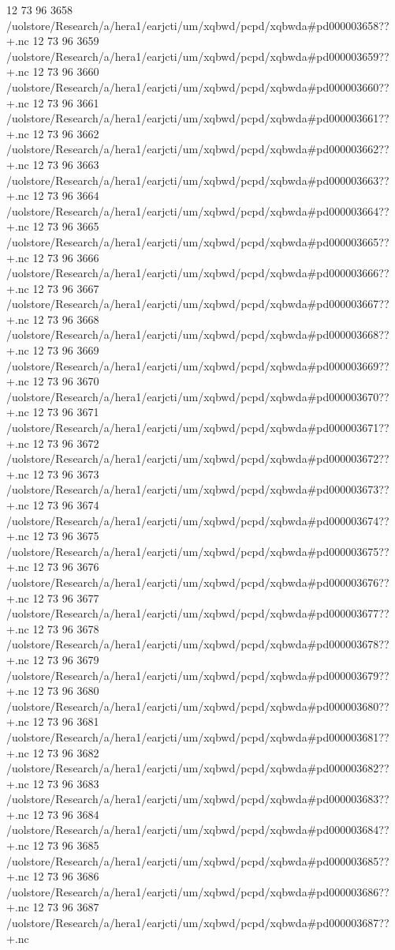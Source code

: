 12 73 96
3658
/uolstore/Research/a/hera1/earjcti/um/xqbwd/pcpd/xqbwda#pd000003658??+.nc
12 73 96
3659
/uolstore/Research/a/hera1/earjcti/um/xqbwd/pcpd/xqbwda#pd000003659??+.nc
12 73 96
3660
/uolstore/Research/a/hera1/earjcti/um/xqbwd/pcpd/xqbwda#pd000003660??+.nc
12 73 96
3661
/uolstore/Research/a/hera1/earjcti/um/xqbwd/pcpd/xqbwda#pd000003661??+.nc
12 73 96
3662
/uolstore/Research/a/hera1/earjcti/um/xqbwd/pcpd/xqbwda#pd000003662??+.nc
12 73 96
3663
/uolstore/Research/a/hera1/earjcti/um/xqbwd/pcpd/xqbwda#pd000003663??+.nc
12 73 96
3664
/uolstore/Research/a/hera1/earjcti/um/xqbwd/pcpd/xqbwda#pd000003664??+.nc
12 73 96
3665
/uolstore/Research/a/hera1/earjcti/um/xqbwd/pcpd/xqbwda#pd000003665??+.nc
12 73 96
3666
/uolstore/Research/a/hera1/earjcti/um/xqbwd/pcpd/xqbwda#pd000003666??+.nc
12 73 96
3667
/uolstore/Research/a/hera1/earjcti/um/xqbwd/pcpd/xqbwda#pd000003667??+.nc
12 73 96
3668
/uolstore/Research/a/hera1/earjcti/um/xqbwd/pcpd/xqbwda#pd000003668??+.nc
12 73 96
3669
/uolstore/Research/a/hera1/earjcti/um/xqbwd/pcpd/xqbwda#pd000003669??+.nc
12 73 96
3670
/uolstore/Research/a/hera1/earjcti/um/xqbwd/pcpd/xqbwda#pd000003670??+.nc
12 73 96
3671
/uolstore/Research/a/hera1/earjcti/um/xqbwd/pcpd/xqbwda#pd000003671??+.nc
12 73 96
3672
/uolstore/Research/a/hera1/earjcti/um/xqbwd/pcpd/xqbwda#pd000003672??+.nc
12 73 96
3673
/uolstore/Research/a/hera1/earjcti/um/xqbwd/pcpd/xqbwda#pd000003673??+.nc
12 73 96
3674
/uolstore/Research/a/hera1/earjcti/um/xqbwd/pcpd/xqbwda#pd000003674??+.nc
12 73 96
3675
/uolstore/Research/a/hera1/earjcti/um/xqbwd/pcpd/xqbwda#pd000003675??+.nc
12 73 96
3676
/uolstore/Research/a/hera1/earjcti/um/xqbwd/pcpd/xqbwda#pd000003676??+.nc
12 73 96
3677
/uolstore/Research/a/hera1/earjcti/um/xqbwd/pcpd/xqbwda#pd000003677??+.nc
12 73 96
3678
/uolstore/Research/a/hera1/earjcti/um/xqbwd/pcpd/xqbwda#pd000003678??+.nc
12 73 96
3679
/uolstore/Research/a/hera1/earjcti/um/xqbwd/pcpd/xqbwda#pd000003679??+.nc
12 73 96
3680
/uolstore/Research/a/hera1/earjcti/um/xqbwd/pcpd/xqbwda#pd000003680??+.nc
12 73 96
3681
/uolstore/Research/a/hera1/earjcti/um/xqbwd/pcpd/xqbwda#pd000003681??+.nc
12 73 96
3682
/uolstore/Research/a/hera1/earjcti/um/xqbwd/pcpd/xqbwda#pd000003682??+.nc
12 73 96
3683
/uolstore/Research/a/hera1/earjcti/um/xqbwd/pcpd/xqbwda#pd000003683??+.nc
12 73 96
3684
/uolstore/Research/a/hera1/earjcti/um/xqbwd/pcpd/xqbwda#pd000003684??+.nc
12 73 96
3685
/uolstore/Research/a/hera1/earjcti/um/xqbwd/pcpd/xqbwda#pd000003685??+.nc
12 73 96
3686
/uolstore/Research/a/hera1/earjcti/um/xqbwd/pcpd/xqbwda#pd000003686??+.nc
12 73 96
3687
/uolstore/Research/a/hera1/earjcti/um/xqbwd/pcpd/xqbwda#pd000003687??+.nc
